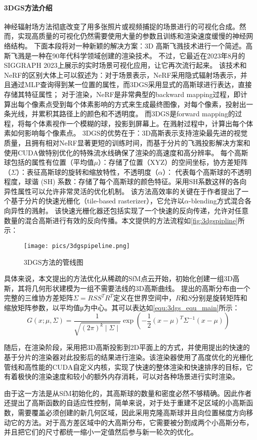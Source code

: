 \paragraph{3DGS方法介绍}
神经辐射场方法彻底改变了用多张照片或视频捕捉的场景进行的可视化合成。然而，实现高质量的可视化仍然需要使用大量的参数且训练和渲染速度缓慢的神经网络结构。
下面本段将对一种新颖的解决方案：3D 高斯飞溅技术进行一个简述。高斯飞溅是一种在90年代科学领域创建的渲染技术。
不过，它最近在2023年8月的 SIGGRAPH 2023上展示的实时场景可视化应用，让它再次流行起来。
该技术和NeRF的区别大体上可以叙述为：对于场景表示，NeRF采用隐式辐射场表示，并且通过MLP查询得到某一位置的属性，而3DGS采用显式的高斯球进行表达，直接存储其特征属性；
对于渲染，NeRF是非常典型的backward mapping过程，即计算出每个像素点受到每个体素影响的方式来生成最终图像，对每个像素，投射出一条光线，并累积其路径上的颜色和不透明度。
而3DGS是forward mapping的过程，将每个体素视作一个模糊的球，投影到屏幕上。在溅射过程中，计算出每个体素如何影响每个像素点。
3DGS的优势在于：3D高斯表示支持渲染最先进的视觉质量，且拥有相对NeRF显著更短的训练时间，而基于分片的飞溅投影解决方案和使用CUDA做特别优化的特殊流水线确保了渲染的高速度和高分辨率。
每个高斯球包括的属性有位置（平均值$\mu$）：存储了位置（XYZ）的空间坐标，协方差矩阵（$\Sigma$）：表征高斯球的旋转和缩放特性，不透明度（$\alpha$）：
代表每个高斯球的不透明程度，球谐 (SH) 系数：存储了每个高斯球的颜色特征。采用SH系数这样的各向异性属性可以允许非常灵活的优化机制。
该方法高效率的关键在于作者提出了一个基于分片的快速光栅化（tile-based rasterizer），它允许以$\alpha$-blending方式混合各向异性的溅射。
该快速光栅化器还包括实现了一个快速的反向传递，允许对任意数量的混合高斯进行有效的反向传播。本文提供的方法流程如\autoref{fig:3dgspipline}所示：

\begin{figure}[htbp]
    \centering
    \texttt{[image: pics/3dgspipeline.png]}
    \caption{\label{fig:3dgspipline}3DGS方法的管线图~\cite{kerbl20233d}}
\end{figure}

具体来说，本文提出的方法优化从稀疏的SfM点云开始，初始化创建一组3D高斯，其将几何形状建模为一组不需要法线的3D高斯曲线。
提出的高斯分布由一个完整的三维协方差矩阵\(\Sigma=RSS^TR^T\)定义在世界空间中，$R$和$S$分别是旋转矩阵和缩放矩阵参数，以平均值μ为中心。其可以表达如\autoref{equ:3dgs_equ_main}所示：
\begin{equation}
    \label{equ:3dgs_equ_main}
    G\left(x;\mu,\Sigma\right)=\frac1{\sqrt{(2\pi)^k\mid\Sigma\mid}}\exp\left(-\frac12(x-\mu)^T\Sigma^{-1}(x-\mu)\right)
\end{equation}
\par 随后，在渲染阶段，采用把3D高斯投影到2D平面上的方式，并使用提出的快速的基于分片的渲染器对此投影后的结果进行渲染。该渲染器使用了高度优化的光栅化管线和高性能的CUDA自定义内核，实现了快速的整体渲染和快速排序的目标，它有着极快的渲染速度和较小的额外内存消耗，可以对各种场景进行实时渲染。
\par 由于这一方法是从SfM初始化的，其高斯球的数量和密度必然不够精确。因此作者还提出了高斯函数的自适应性控制，简单来说，对于处于重建不足区域的小高斯函数，需要覆盖必须创建的新几何区域，因此采用克隆高斯球并且向位置梯度方向移动它的方法。对于高方差区域中的大高斯分布，它需要被分割成两个小高斯分布，并且把它们的尺寸都统一缩小一定值然后参与新一轮次的优化。

